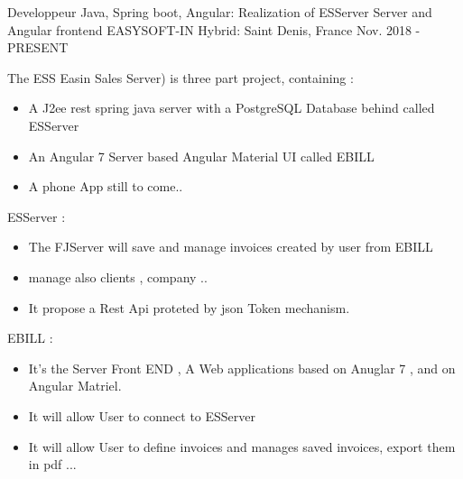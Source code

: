\documentclass[11pt, a4paper]{awesome-cv} %
\begin{document}
\begin{cventries}

    \cventry
    {Developpeur Java, Spring boot, Angular: Realization of ESServer Server and Angular frontend } %
    {EASYSOFT-IN} %
    {Hybrid: Saint Denis, France } %
    {Nov. 2018 - PRESENT} %
    { %
        \begin{cvitems}
            \item {The ESS  Easin Sales Server) is three part project, containing :}
            \begin{itemize}
                \item { A J2ee rest spring java server with a PostgreSQL Database behind called ESServer}
                \item { An Angular 7 Server based Angular Material UI called EBILL }
                \item { A phone App still to come..}
            \end{itemize}
            \item {  ESServer : }
            \begin{itemize}
                \item{ The FJServer will save and manage invoices created by user from EBILL}
                \item{ manage also clients , company ..}
                \item{ It propose a Rest Api proteted by json Token mechanism.}
            \end{itemize}
            \item {EBILL :}
            \begin{itemize}
                \item {It's the Server Front END , A Web applications based on Anuglar 7 , and on Angular Matriel.}
                \item { It will allow User to connect to ESServer}
                \item { It will allow User to define invoices and manages saved invoices, export them in pdf ...}
            \end{itemize}
        \end{cvitems}
    }



\end{cventries}
\end{document}
